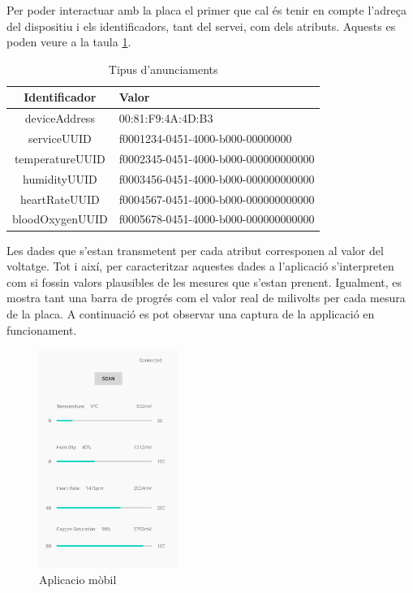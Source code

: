 Per poder interactuar amb la placa el primer que cal és tenir en compte l'adreça del dispositiu i els identificadors, tant del servei, com dels atributs.
Aquests es poden veure a la taula \ref{taula_app}.

\begin{table}[!h]
	\begin{center}
		\begin{tabular}{|c|l|}
			\hline
			Identificador	&	Valor	\\	\hline
			deviceAddress	&	00:81:F9:4A:4D:B3	\\	\hline
			serviceUUID		&	f0001234-0451-4000-b000-00000000		\\	\hline
			temperatureUUID	&	f0002345-0451-4000-b000-000000000000	\\	\hline
			humidityUUID	&	f0003456-0451-4000-b000-000000000000	\\	\hline
			heartRateUUID	&	f0004567-0451-4000-b000-000000000000	\\	\hline
			bloodOxygenUUID	&	f0005678-0451-4000-b000-000000000000	\\	\hline
		\end{tabular}
	\end{center}
	\caption{Tipus d'anunciaments}
	\label{taula_app}
\end{table}

Les dades que s'estan transmetent per cada atribut corresponen al valor del voltatge.
Tot i així, per caracteritzar aquestes dades a l'aplicació s'interpreten com si fossin valors plausibles de les mesures que s'estan prenent.
Igualment, es mostra tant una barra de progrés com el valor real de milivolts per cada mesura de la placa.
A continuació es pot observar una captura de la applicació en funcionament.

\begin{figure}[h]
	\begin{center}
		\includegraphics[width=0.4\textwidth]{./images/captura_app.jpg}
		\caption{Aplicacio mòbil}
	\end{center}
\end{figure}

